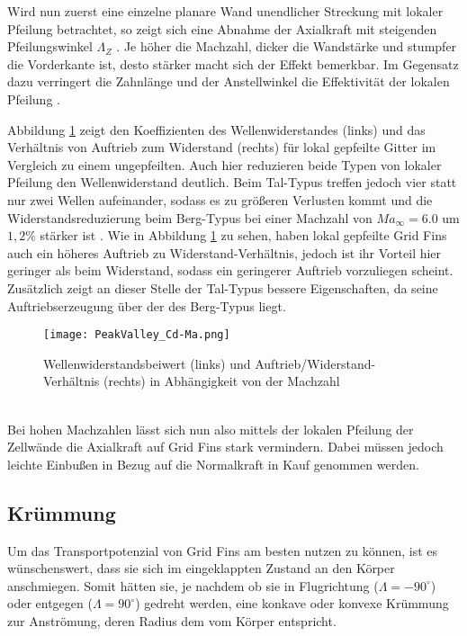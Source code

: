 Wird nun zuerst eine einzelne planare Wand unendlicher Streckung mit lokaler Pfeilung betrachtet, so zeigt sich eine Abnahme der Axialkraft mit steigenden Pfeilungswinkel $\Lambda_Z$ \cite{PeakValley}. Je höher die Machzahl, dicker die Wandstärke und stumpfer die Vorderkante ist, desto stärker macht sich der Effekt bemerkbar. Im Gegensatz dazu verringert die Zahnlänge und der Anstellwinkel die Effektivität der lokalen Pfeilung \cite{PeakValley}.

Abbildung \ref{abb_PeakValley-Ma} zeigt den Koeffizienten des Wellenwiderstandes (links) und das Verhältnis von Auftrieb zum Widerstand (rechts) für lokal gepfeilte Gitter im Vergleich zu einem ungepfeilten.
Auch hier reduzieren beide Typen von lokaler Pfeilung den Wellenwiderstand deutlich. Beim Tal-Typus treffen jedoch vier statt nur zwei Wellen aufeinander, sodass es zu größeren Verlusten kommt und die Widerstandsreduzierung beim Berg-Typus bei einer Machzahl von $Ma_\infty=6.0$ um $1,2\%$ stärker ist \cite{PeakValley}.
Wie in Abbildung \ref{abb_PeakValley-Ma} zu sehen, haben lokal gepfeilte Grid Fins auch ein höheres Auftrieb zu Widerstand-Verhältnis, jedoch ist ihr Vorteil hier geringer als beim Widerstand, sodass ein geringerer Auftrieb vorzuliegen scheint. Zusätzlich zeigt an dieser Stelle der Tal-Typus bessere Eigenschaften, da seine Auftriebserzeugung über der des Berg-Typus liegt. 
\begin{figure}[h]
	\centering
	\texttt{[image: PeakValley\_Cd-Ma.png]}
	\begin{flushright}
	\end{flushright}
	\caption{Wellenwiderstandsbeiwert (links) und Auftrieb/Widerstand-Verhältnis (rechts) in Abhängigkeit von der Machzahl}
	\label{abb_PeakValley-Ma}
\end{figure}\\
Bei hohen Machzahlen lässt sich nun also mittels der lokalen Pfeilung der Zellwände die Axialkraft auf Grid Fins stark vermindern. Dabei müssen jedoch leichte Einbußen in Bezug auf die Normalkraft in Kauf genommen werden.
\subsection{Krümmung}
Um das Transportpotenzial von Grid Fins am besten nutzen zu können, ist es wünschenswert, dass sie sich im eingeklappten Zustand an den Körper anschmiegen. Somit hätten sie, je nachdem ob sie in Flugrichtung ($\Lambda = -90^\circ$) oder entgegen ($\Lambda = 90^\circ$) gedreht werden, eine konkave oder konvexe Krümmung zur Anströmung, deren Radius dem vom Körper entspricht.


